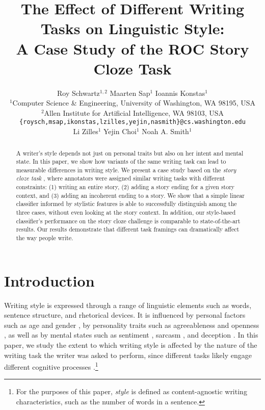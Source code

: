 \documentclass[11pt,a4paper]{article}
\title{The Effect of Different Writing Tasks on Linguistic Style:\\ A Case Study of the ROC Story Cloze Task}
\author{\hspace{2cm}Roy Schwartz$^{1,2}$ \And \hspace{2.5cm}Maarten Sap$^1$ \And \hspace{3cm}Ioannis Konstas$^1$ \And \\
  $^1$Computer Science \& Engineering, University of Washington, WA 98195, USA \\
  $^2$Allen Institute for Artificial Intelligence, WA 98103, USA \\
    {\tt \{roysch,msap,ikonstas,lzilles,yejin,nasmith\}@cs.washington.edu}  \\
    \And \hspace{-2cm}Li Zilles$^1$ \And \hspace{-2.5cm}Yejin Choi$^1$ \And \hspace{-2.5cm}Noah A. Smith$^1$ \\
  }
\date{}
\newcommand{\resolved}[1]{}
\newcommand{\roy}[1]{{\color{orange}\textsc{[#1 --rs]}}}
\newcommand{\nascomment}[1]{{\color{blue}\textsc{[#1 --nas]}}}
\newcommand{\clinic}[1]{{\color{magenta}\textsc{[#1 --CLINIC]}}}
\renewcommand{\roy}[1]{{\color{orange}[#1 --rs]}}
\renewcommand{\roy}[1]{#1}
\renewcommand{\nascomment}[1]{}
\begin{document}
\maketitle
\begin{abstract}
A writer's style depends not just on personal traits but also on her intent and mental state.
In this paper, we show how variants of the same writing task can lead to measurable differences in writing style.
We present a case study based on 
the  {\it story cloze task} \cite{Mostafazadeh:2016},
where annotators were assigned similar writing tasks with different constraints: (1) writing an entire story, (2) adding a story ending for a given story context, and (3) adding an incoherent ending to a story.\resolved{\clinic{Many felt these 2 constraints looks like 3 constraints. clarify}}
We show that a simple linear classifier informed by stylistic features is able to successfully distinguish among the three cases, without even looking at the story context.
\roy{In addition, our style-based classifier's performance on the story cloze challenge is comparable to state-of-the-art results.} 
Our results demonstrate that different task framings can dramatically affect the way people write.\resolved{\clinic{Similarly to previous comment: which results does this comment address?}}


\resolved{They also provide important lessons for designing new NLP
tasks. \nascomment{drop this sentence if we only have a paragraph
  about this at the end, as we currently do}}

\end{abstract}

\section{Introduction}
Writing style is expressed through a range of linguistic elements such as words, sentence structure, and rhetorical devices.
It is influenced by personal factors such as age and gender \cite{Schler:2006}, 
by personality traits such as agreeableness and openness  \cite{Ireland:2014b},
as well as by mental states\resolved{\clinic{Avoid using ``cognitive"?}} such as sentiment \cite{Davidov:2010}, sarcasm \cite{Tsur:2010}, and deception \cite{Feng:2012}.  
In this paper, we study the extent to which writing style is affected by the nature of the writing task the writer was asked to perform, since
different tasks likely engage different cognitive processes \cite{Campbell:2003,Banerjee:2014}.\roy{\footnote{For the purposes of this paper, \emph{style} is defined as content-agnostic writing characteristics, such as the number of words in a sentence.}}
\end{document}
